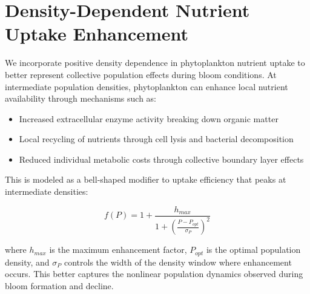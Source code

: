 \section{Density-Dependent Nutrient Uptake Enhancement}

We incorporate positive density dependence in phytoplankton nutrient uptake to better represent collective population effects during bloom conditions. At intermediate population densities, phytoplankton can enhance local nutrient availability through mechanisms such as:

\begin{itemize}
\item Increased extracellular enzyme activity breaking down organic matter
\item Local recycling of nutrients through cell lysis and bacterial decomposition
\item Reduced individual metabolic costs through collective boundary layer effects
\end{itemize}

This is modeled as a bell-shaped modifier to uptake efficiency that peaks at intermediate densities:

\[ f(P) = 1 + \frac{h_{max}}{1 + \left(\frac{P - P_{opt}}{\sigma_P}\right)^2} \]

where $h_{max}$ is the maximum enhancement factor, $P_{opt}$ is the optimal population density, and $\sigma_P$ controls the width of the density window where enhancement occurs. This better captures the nonlinear population dynamics observed during bloom formation and decline.
